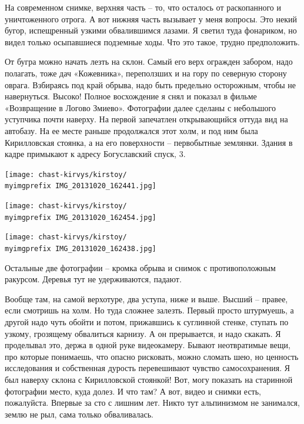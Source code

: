 На современном снимке, верхняя часть – то, что осталось от раскопанного и уничтоженного отрога. А вот нижняя часть вызывает у меня вопросы. Это некий бугор, испещренный узкими обвалившимся лазами. Я светил туда фонариком, но видел только осыпавшиеся подземные ходы. Что это такое, трудно предположить.

От бугра можно начать лезть на склон. Самый его верх огражден забором, надо полагать, тоже дач «Кожевника», переползших и на гору по северную сторону оврага. Взбираясь под край обрыва, надо быть предельно осторожным, чтобы не навернуться. Высоко! Полное восхождение я снял и показал в фильме «Возвращение в Логово Змиево». Фотографии далее сделаны с небольшого уступчика почти наверху. На первой запечатлен открывающийся оттуда вид на автобазу. На ее месте раньше продолжался этот холм, и под ним была Кирилловская стоянка, а на его поверхности – первобытные землянки. Здания в кадре примыкают к адресу Богуславский спуск, 3.

\newpage
\vspace*{\fill}
\begin{center}
\texttt{[image: chast-kirvys/kirstoy/\\myimgprefix IMG\_20131020\_162441.jpg]}
\end{center}

\begin{center}
\texttt{[image: chast-kirvys/kirstoy/\\myimgprefix IMG\_20131020\_162454.jpg]}
\end{center}
\vspace*{\fill}
\newpage

\begin{center}
\texttt{[image: chast-kirvys/kirstoy/\\myimgprefix IMG\_20131020\_162438.jpg]}
\end{center}

Остальные две фотографии – кромка обрыва и снимок с противоположным ракурсом. Деревья тут не удерживаются, падают.

Вообще там, на самой верхотуре, два уступа, ниже и выше. Высший – правее, если смотришь на холм. Но туда сложнее залезть. Первый просто штурмуешь, а другой надо чуть обойти и потом, прижавшись к суглинной стенке, ступать по узкому, грозящему обвалиться карнизу. А он прерывается, и надо скакать. Я проделывал это, держа в одной руке видеокамеру. Бывают неотвратимые вещи, про которые понимаешь, что опасно рисковать, можно сломать шею, но ценность исследования и собственная дурость перевешивают чувство самосохранения. Я был наверху склона с Кирилловской стоянкой! Вот, могу показать на старинной фотографии место, куда долез. И что там? А вот, видео и снимки есть, пожалуйста. Впервые за сто с лишним лет. Никто тут альпинизмом не занимался, землю не рыл, сама только обваливалась.

